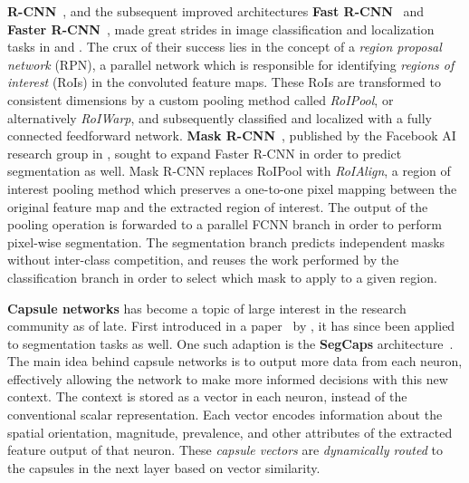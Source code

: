 \textbf{R-CNN}~\cite{r-cnn}, and the subsequent improved architectures \textbf{Fast R-CNN}~\cite{fast-r-cnn} and \textbf{Faster R-CNN}~\cite{faster-r-cnn}, made great strides in image classification and localization tasks in \citeyear{r-cnn} and \citeyear{faster-r-cnn}.
The crux of their success lies in the concept of a \textit{region proposal network} (RPN), a parallel network which is responsible for identifying \textit{regions of interest} (RoIs) in the convoluted feature maps.
These RoIs are transformed to consistent dimensions by a custom pooling method called \textit{RoIPool}, or alternatively \textit{RoIWarp}, and subsequently classified and localized with a fully connected feedforward network.
\textbf{Mask R-CNN}~\cite{mask-r-cnn}, published by the Facebook AI research group in \citeyear{mask-r-cnn}, sought to expand Faster R-CNN in order to predict segmentation as well.
Mask R-CNN replaces RoIPool with \textit{RoIAlign}, a region of interest pooling method which preserves a one-to-one pixel mapping between the original feature map and the extracted region of interest.
The output of the pooling operation is forwarded to a parallel FCNN branch in order to perform pixel-wise segmentation.
The segmentation branch predicts independent masks without inter-class competition, and reuses the work performed by the classification branch in order to select which mask to apply to a given region.

\textbf{Capsule networks} has become a topic of large interest in the research community as of late.
First introduced in a paper~\cite{capsules} by \citeauthor{capsules}, it has since been applied to segmentation tasks as well.
One such adaption is the \textbf{SegCaps} architecture~\cite{segmentation-segcaps}.
The main idea behind capsule networks is to output more data from each neuron, effectively allowing the network to make more informed decisions with this new context.
The context is stored as a vector in each neuron, instead of the conventional scalar representation.
Each vector encodes information about the spatial orientation, magnitude, prevalence, and other attributes of the extracted feature output of that neuron.
These \textit{capsule vectors} are \textit{dynamically routed} to the capsules in the next layer based on vector similarity.
